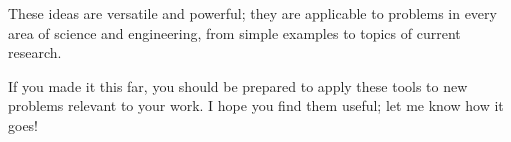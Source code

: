 \documentclass[12pt]{book}
\theoremstyle{exercise}
\begin{document}
These ideas are versatile and powerful; they are applicable to
problems in every area of science and engineering, from simple
examples to topics of current research.

If you made it this far, you should be prepared to apply these
tools to new problems relevant to your work.  I hope you find
them useful; let me know how it goes!













\printindex
\end{document}
